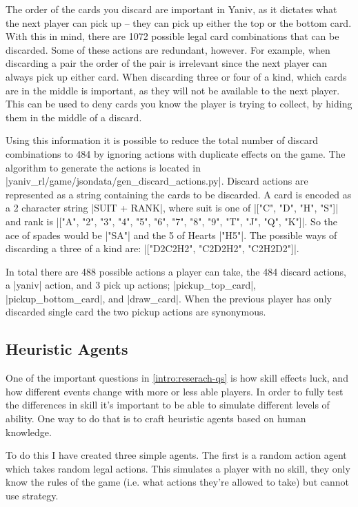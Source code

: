 \documentclass[../main.tex]{subfiles}
\begin{document}
The order of the cards you discard are important in Yaniv, as it dictates what the next player can pick up -- they can pick up either the top or the bottom card. With this in mind, there are 1072 possible legal card combinations that can be discarded. Some of these actions are redundant, however. For example, when discarding a pair the order of the pair is irrelevant since the next player can always pick up either card. When discarding three or four of a kind, which cards are in the middle is important, as they will not be available to the next player. This can be used to deny cards you know the player is trying to collect, by hiding them in the middle of a discard. 

Using this information it is possible to reduce the total number of discard combinations to 484 by ignoring actions with duplicate effects on the game. The algorithm to generate the actions is located in |yaniv_rl/game/jsondata/gen_discard_actions.py|. Discard actions are represented as a string containing the cards to be discarded. A card is encoded as a 2 character string |SUIT + RANK|, where suit is one of |["C", "D", "H", "S"]| and rank is |["A", "2", "3", "4", "5", "6", "7", "8", "9", "T", "J", "Q", "K"]|. So the ace of spades would be |"SA"| and the 5 of Hearts |"H5"|. The possible ways of discarding a three of a kind are: |["D2C2H2", "C2D2H2", "C2H2D2"]|. 

In total there are 488 possible actions a player can take, the 484 discard actions, a |yaniv| action, and 3 pick up actions; |pickup_top_card|, |pickup_bottom_card|, and |draw_card|. When the previous player has only 
discarded single card the two pickup actions are synonymous. 


\subsection{Heuristic Agents} \label{method:rule_agents}
One of the important questions in \cref{intro:reserach-qs} is how skill effects luck, and how different events change with more or less able players. In order to fully test the differences in skill it's important to be able to simulate different levels of ability. One way to do that is to craft heuristic agents based on human knowledge. 

To do this I have created three simple agents. The first is a random action agent which takes random legal actions. This simulates a player with no skill, they only know the rules of the game (i.e. what actions they're allowed to take) but cannot use strategy.
\end{document}
